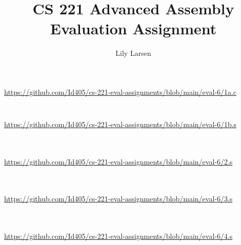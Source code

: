 \documentclass{article}
\title{CS 221 Advanced Assembly Evaluation Assignment}
\author{Lily Larsen}
\newcommand{\nicecode}[2]{\inputminted[linenos=true,breaklines,fontsize=\small]{#1}{#2}}
\begin{document}
\maketitle
\newpage

\section{}
\subsection{}
\vspace{2ex} \par
\url{https://github.com/Id405/cs-221-eval-assignments/blob/main/eval-6/1a.c}
\nicecode{c}{1a.c}
\subsection{}
\vspace{2ex} \par
\url{https://github.com/Id405/cs-221-eval-assignments/blob/main/eval-6/1b.s}
\nicecode{asm}{1b.s}
\newpage

\section{}
\vspace{2ex} \par
\url{https://github.com/Id405/cs-221-eval-assignments/blob/main/eval-6/2.s}
\nicecode{asm}{2.s}
\newpage

\section{}
\vspace{2ex} \par
\url{https://github.com/Id405/cs-221-eval-assignments/blob/main/eval-6/3.s}
\nicecode{asm}{3.s}
\newpage

\section{}
\vspace{2ex} \par
\url{https://github.com/Id405/cs-221-eval-assignments/blob/main/eval-6/4.s}
\nicecode{asm}{4.s}
\newpage

\newpage
\end{document}
